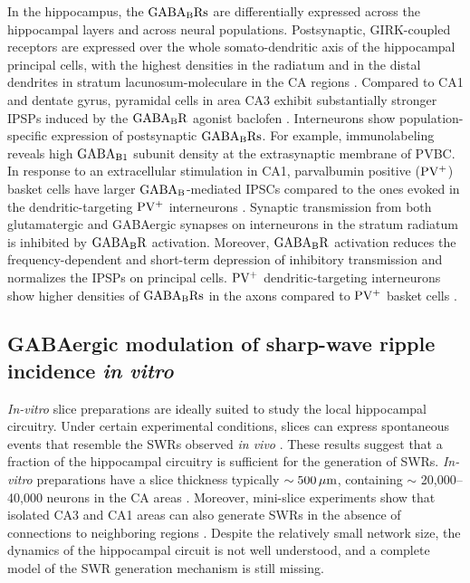       In the hippocampus, the $\rm GABA_BRs$ are differentially expressed
      across the hippocampal layers and across neural populations.
      Postsynaptic, GIRK-coupled receptors are expressed over the whole
      somato-dendritic axis of the hippocampal principal cells, with the
      highest densities in the radiatum and in the distal dendrites in stratum
      lacunosum-moleculare in the CA regions \citep{Degro2015}. Compared to CA1
      and dentate gyrus, pyramidal cells in area CA3 exhibit substantially
      stronger IPSPs induced by the $\rm GABA_BR$ agonist baclofen
      \citep{Degro2015}.  Interneurons show population-specific expression of
      postsynaptic $\rm GABA_BRs$. For example, immunolabeling reveals high
      $\rm GABA_{B1}$ subunit density at the extrasynaptic membrane of PVBC. In
      response to an extracellular stimulation in CA1, parvalbumin positive
      ($\rm PV^+$) basket cells have larger $\rm GABA_B$-mediated IPSCs
      compared to the ones evoked in the dendritic-targeting $\rm PV^+$
      interneurons \citep{Lei2003}. Synaptic transmission from both
      glutamatergic and GABAergic synapses on interneurons in the
      stratum radiatum is inhibited by $\rm GABA_BR$ activation. Moreover, $\rm
      GABA_BR$ activation reduces the frequency-dependent and short-term
      depression of inhibitory transmission and normalizes the IPSPs on
      principal cells. $\rm PV^+$ dendritic-targeting interneurons show higher
      densities of $\rm GABA_BRs$ in the axons compared to $\rm PV^+$ basket
      cells \citep{Booker2013}.

  \subsection{GABAergic modulation of sharp-wave ripple incidence \textit{in vitro}}
  \label{swr_modulation}
    \textit{In-vitro} slice preparations are ideally suited to study the local
    hippocampal circuitry. Under certain experimental conditions, slices can
    express spontaneous events that resemble the SWRs observed \textit{in vivo}
    \citep{Hajos2009, Maier2009}. These results suggest that a fraction of the
    hippocampal circuitry is sufficient for the generation of SWRs.
    \textit{In-vitro} preparations have a slice thickness typically $\sim 500
    \, \rm \mu m$, containing $\sim$ 20,000--40,000 neurons in the CA areas
    \citep[an estimate based on the numbers of neurons in the rat hippocampus
    and slice thickness;][]{Boss1985, West1991, Bezaire2013}. Moreover,
    mini-slice experiments show that isolated CA3 and CA1 areas can also
    generate SWRs in the absence of connections to neighboring regions
    \citep{Maier2003}. Despite the relatively small network size, the dynamics
    of the hippocampal circuit is not well understood, and a complete model of
    the SWR generation mechanism is still missing.

